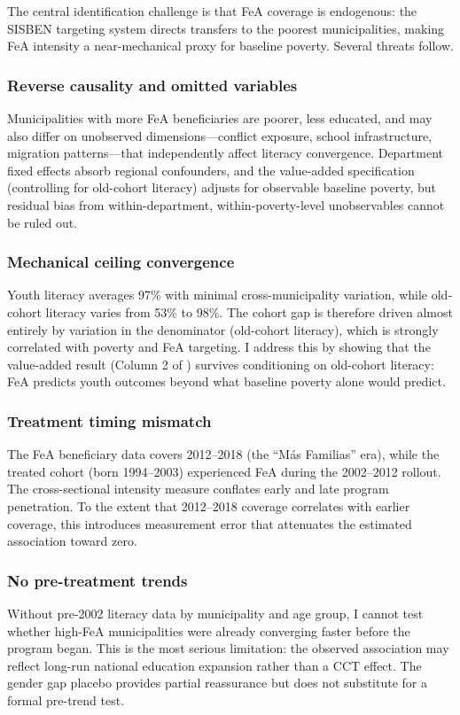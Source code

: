 \documentclass[12pt]{article}
\begin{document}
The central identification challenge is that FeA coverage is endogenous: the SISBEN targeting system directs transfers to the poorest municipalities, making FeA intensity a near-mechanical proxy for baseline poverty. Several threats follow.

\subsubsection*{Reverse causality and omitted variables} Municipalities with more FeA beneficiaries are poorer, less educated, and may also differ on unobserved dimensions---conflict exposure, school infrastructure, migration patterns---that independently affect literacy convergence. Department fixed effects absorb regional confounders, and the value-added specification (controlling for old-cohort literacy) adjusts for observable baseline poverty, but residual bias from within-department, within-poverty-level unobservables cannot be ruled out.

\subsubsection*{Mechanical ceiling convergence} Youth literacy averages 97\% with minimal cross-municipality variation, while old-cohort literacy varies from 53\% to 98\%. The cohort gap is therefore driven almost entirely by variation in the denominator (old-cohort literacy), which is strongly correlated with poverty and FeA targeting. I address this by showing that the value-added result (Column 2 of ) survives conditioning on old-cohort literacy: FeA predicts youth outcomes beyond what baseline poverty alone would predict.

\subsubsection*{Treatment timing mismatch} The FeA beneficiary data covers 2012--2018 (the ``M\'{a}s Familias'' era), while the treated cohort (born 1994--2003) experienced FeA during the 2002--2012 rollout. The cross-sectional intensity measure conflates early and late program penetration. To the extent that 2012--2018 coverage correlates with earlier coverage, this introduces measurement error that attenuates the estimated association toward zero.

\subsubsection*{No pre-treatment trends} Without pre-2002 literacy data by municipality and age group, I cannot test whether high-FeA municipalities were already converging faster before the program began. This is the most serious limitation: the observed association may reflect long-run national education expansion rather than a CCT effect. The gender gap placebo provides partial reassurance but does not substitute for a formal pre-trend test.
\end{document}
